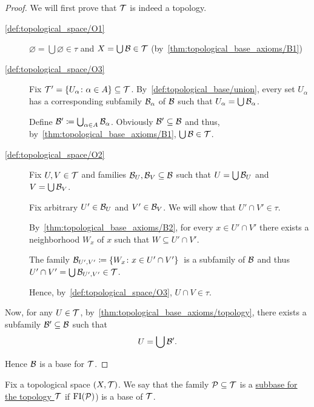 \begin{proof}
  We will first prove that $\mathcal T$ is indeed a topology.

  \begin{description}
    \item[\ref{def:topological_space/O1}] $\varnothing = \bigcup \varnothing \in \tau$ and $X = \bigcup \mathcal B \in \mathcal T$ (by~\ref{thm:topological_base_axioms/B1})

    \item[\ref{def:topological_space/O3}] Fix $\mathcal T' = \{ U_\alpha \colon \alpha \in A \} \subseteq \mathcal T$. By~\cref{def:topological_base/union}, every set $U_\alpha$ has a corresponding subfamily $\mathcal B_\alpha$ of $\mathcal B$ such that $U_\alpha = \bigcup \mathcal B_\alpha$.

    Define $\mathcal B' \coloneqq \bigcup_{\alpha \in A} \mathcal B_\alpha$. Obviously $\mathcal B' \subseteq \mathcal B$ and thus, by~\ref{thm:topological_base_axioms/B1}, $\bigcup \mathcal B \in \mathcal T$.

    \item[\ref{def:topological_space/O2}] Fix $U, V \in \mathcal T$ and families $\mathcal B_U, \mathcal B_V \subseteq \mathcal B$ such that $U = \bigcup \mathcal B_U$ and $V = \bigcup \mathcal B_V$.

    Fix arbitrary $U' \in \mathcal B_U$ and $V' \in \mathcal B_V$. We will show that $U' \cap V' \in \tau$.

    By~\ref{thm:topological_base_axioms/B2}, for every $x \in U' \cap V'$ there exists a neighborhood $W_x$ of $x$ such that $W \subseteq U' \cap V'$.

    The family $\mathcal B_{U',V'} \coloneqq \{ W_x \colon x \in U' \cap V' \}$~\AOC is a subfamily of $\mathcal B$ and thus $U' \cap V' = \bigcup \mathcal B_{U',V'} \in \mathcal T$.

    Hence, by~\ref{def:topological_space/O3}, $U \cap V \in \tau$.
  \end{description}

  Now, for any $U \in \mathcal T$, by~\cref{thm:topological_base_axioms/topology}, there exists a subfamily $\mathcal B' \subseteq \mathcal B$ such that
  \begin{align*}
    U = \bigcup \mathcal B'.
  \end{align*}

  Hence $\mathcal B$ is a base for $\mathcal T$.
\end{proof}

\begin{definition}\label{def:topological_subbase}\cite[12]{Engelking1989}
  Fix a topological space $(X, \mathcal T)$. We say that the family $\mathcal P \subseteq \mathcal T$ is a \uline{subbase for the topology $\mathcal T$} if $\operatorname{FI}(\mathcal P)$) is a base of $\mathcal T$.
\end{definition}

